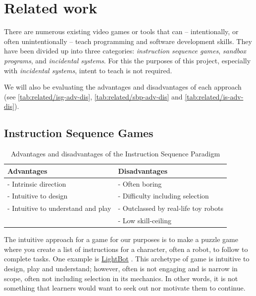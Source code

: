 \section{Related work}\label{sec:background/related}

There are numerous existing video games or tools that can -- intentionally, or often unintentionally -- teach programming and software development skills. They have been divided up into three categories: \textit{instruction sequence games}, \textit{sandbox programs}, and \textit{incidental systems}. For this the purposes of this project, especially with \textit{incidental systems}, intent to teach is not required.

We will also be evaluating the advantages and disadvantages of each approach (see \autoref{tab:related/isg-adv-dis}, \ref{tab:related/sbp-adv-dis} and \ref{tab:related/is-adv-dis}). 

\pagebreak %

\subsection{Instruction Sequence Games}

\begin{table}[h]
    \centering
    \begin{tabular}{|p{6cm}|p{6cm}|}\hline
        \textbf{Advantages} & \textbf{Disadvantages} \\\hline
        - Intrinsic direction & - Often boring \\
        - Intuitive to design & - Difficulty including selection \\
        - Intuitive to understand and play & - Outclassed by real-life toy robots \\
        & - Low skill-ceiling \\
    \hline\end{tabular}
    \caption{Advantages and disadvantages of the Instruction Sequence Paradigm}
    \label{tab:related/isg-adv-dis}
\end{table}

The intuitive approach for a game for our purposes is to make a puzzle game where you create a list of instructions for a character, often a robot, to follow to complete tasks. One example is \href{https://lightbot.com/}{LightBot} \citep{programmingAppsNYT,lightBot}. This archetype of game is intuitive to design, play and understand; however, often is not engaging and is narrow in scope, often not including selection in its mechanics. In other words, it is not something that learners would want to seek out nor motivate them to continue.

